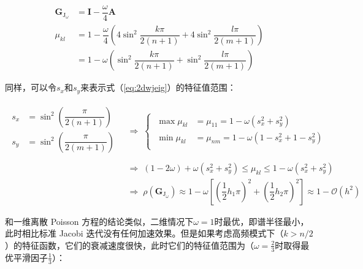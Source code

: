 \documentclass[12pt, UTF8, nofonts]{ctexart}
\begin{document}
\begin{equation}
  \label{eq:2dwjeig}
  \begin{aligned}
    \boldsymbol{G}_{\mathrm{J}_\omega} &= \boldsymbol{I} - \dfrac{\omega}{4}\boldsymbol{A} \\
    \mu_{kl} &= 1 - \dfrac{\omega}{4}\left(4\sin^2\dfrac{k\pi}{2(n+1)} + 4\sin^2\dfrac{l\pi}{2(m+1)}\right) \\
    &= 1 - \omega\left(\sin^2\dfrac{k\pi}{2(n+1)} + \sin^2\dfrac{l\pi}{2(m+1)}\right)
  \end{aligned}
\end{equation}

同样，可以令$s_x$和$s_y$来表示式（\ref{eq:2dwjeig}）的特征值范围：

\begin{equation}
  \label{eq:2dwjeigrange}
  \begin{aligned}
    \begin{aligned}
      s_x &= \sin^2\left(\dfrac{\pi}{2(n+1)}\right) \\
      s_y &= \sin^2\left(\dfrac{\pi}{2(m+1)}\right) \\
    \end{aligned} \;&\Rightarrow\;
    \left\{\; \begin{aligned}
      \max\mu_{kl} &= \mu_{11} = 1 - \omega (s_x^2 + s_y^2) \\
      \min\mu_{kl} &= \mu_{nm} = 1 - \omega (1 - s_x^2 + 1 - s_y^2) \\
    \end{aligned} \right. \\
    \;&\Rightarrow\; (1-2\omega) + \omega(s_x^2+s_y^2) \leq \mu_{kl} \leq 1 - \omega(s_x^2+s_y^2) \\
    \;&\Rightarrow\; \rho(\boldsymbol{G}_{\mathrm{J}_\omega}) \approx 1 - \omega \left[ \left(\dfrac{1}{2}h_1\pi\right)^2 + \left(\dfrac{1}{2}h_2\pi\right)^2 \right] \approx 1 - \mathcal{O}(h^2)
  \end{aligned}
\end{equation}

和一维离散 Poisson 方程的结论类似，二维情况下$\omega=1$时最优，即谱半径最小，此时相比标准 Jacobi 迭代没有任何加速效果。但是如果考虑高频模式下（$k>n/2$）的特征函数，它们的衰减速度很快，此时它们的特征值范围为（$\omega=\frac{2}{3}$时取得最优平滑因子$\frac{1}{3}$）：
\end{document}
